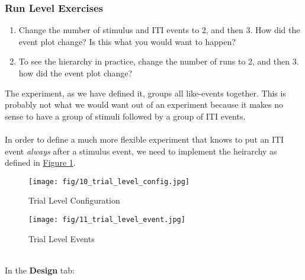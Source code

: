\documentclass[10pt]{article}
\begin{document}
		\subsubsection*{Run Level Exercises}
		\label{subsubsection:run_hier_ex}
			\begin{enumerate}
				\item Change the number of stimulus and ITI events to 2, and then 3. 
				How did the event plot change?
				Is this what you would want to happen?
				\item To see the hierarchy in practice, change the number of runs to 2, and then 3.
				how did the event plot change?
			\end{enumerate}

		The experiment, as we have defined it, groups all like-events together.
		This is probably not what we would want out of an experiment because it makes no sense to have a group of stimuli followed by a group of ITI events. \\ \\
		In order to define a much more flexible experiment that knows to put an ITI event \textit{always} after a stimulus event, we need to implement the heirarchy as defined in \hyperref[fig:trial_hierarchy_config]{Figure \ref{fig:trial_hierarchy_config}}.
		\begin{figure}[ht]
			\centering
			\texttt{[image: fig/10\_trial\_level\_config.jpg]}
			\caption{Trial Level Configuration}
			\label{fig:trial_hierarchy_config}
		\end{figure}
		\begin{figure}[ht]
			\centering
			\texttt{[image: fig/11\_trial\_level\_event.jpg]}
			\caption{Trial Level Events}
			\label{fig:trial_hierarchy_events}
		\end{figure} \\
		In the \textbf{Design} tab:
\end{document}
